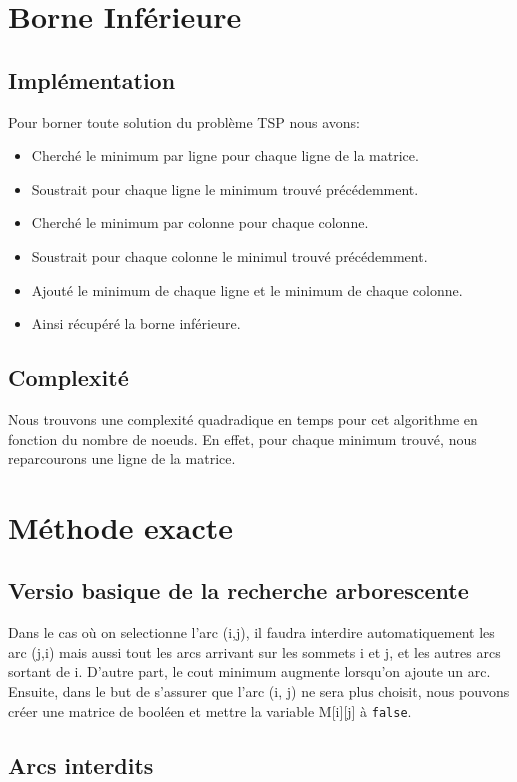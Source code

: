 \documentclass[a4paper,11pt]{article}
\begin{document}
\section{Borne Inférieure}
\subsection{Implémentation}
\indent Pour borner toute solution du problème TSP nous avons:
\begin{itemize}
\item Cherché le minimum par ligne pour chaque ligne de la matrice.
\item Soustrait pour chaque ligne le minimum trouvé précédemment.
\item Cherché le minimum par colonne pour chaque colonne.
\item Soustrait pour chaque colonne le minimul trouvé précédemment.
\item Ajouté le minimum de chaque ligne et le minimum de chaque colonne.
\item Ainsi récupéré la borne inférieure.
\end{itemize}
\subsection{Complexité}
\indent Nous trouvons une complexité quadradique en temps pour cet algorithme en fonction du nombre de noeuds. En effet, pour chaque minimum trouvé, nous reparcourons une ligne de la matrice.
\section{Méthode exacte}
\subsection{Versio basique de la recherche arborescente}
Dans le cas où on selectionne l'arc (i,j), il faudra interdire automatiquement les arc (j,i) mais aussi tout les arcs arrivant sur les sommets i et j, et les autres arcs sortant de i. D'autre part, le cout minimum augmente lorsqu'on ajoute un arc. 
Ensuite, dans le but de s'assurer que l'arc (i, j) ne sera plus choisit, nous pouvons créer une matrice de booléen et mettre la variable M[i][j] à \texttt{false}.







\subsection{Arcs interdits}
\end{document}
